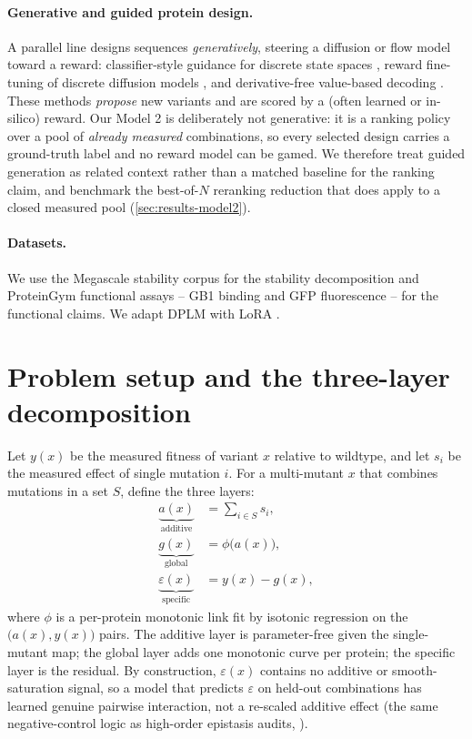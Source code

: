 \documentclass{article}
\newcommand{\eps}{\varepsilon}
\begin{document}
\paragraph{Generative and guided protein design.}
A parallel line designs sequences \emph{generatively}, steering a diffusion or
flow model toward a reward: classifier-style guidance for discrete state spaces
\citep{gruver2023protein,nisonoff2025unlocking}, reward fine-tuning of discrete
diffusion models \citep{wang2025drakes}, and derivative-free value-based decoding
\citep{li2024svdd}. These methods \emph{propose} new variants and are scored by a
(often learned or in-silico) reward. Our Model 2 is deliberately not generative:
it is a ranking policy over a pool of \emph{already measured} combinations, so
every selected design carries a ground-truth label and no reward model can be
gamed. We therefore treat guided generation as related context rather than a
matched baseline for the ranking claim, and benchmark the best-of-$N$ reranking
reduction that does apply to a closed measured pool (\cref{sec:results-model2}).

\paragraph{Datasets.}
We use the Megascale stability corpus \citep{tsuboyama2023mega} for the
stability decomposition and ProteinGym \citep{notin2023proteingym} functional
assays -- GB1 binding \citep{olson2014comprehensive,wu2016adaptation} and GFP
fluorescence \citep{sarkisyan2016local} -- for the functional claims. We adapt
DPLM \citep{wang2024dplm} with LoRA \citep{hu2022lora}.

\section{Problem setup and the three-layer decomposition}
\label{sec:decomp}

Let $y(x)$ be the measured fitness of variant $x$ relative to wildtype, and let
$s_i$ be the measured effect of single mutation $i$. For a multi-mutant $x$ that
combines mutations in a set $S$, define the three layers:
\begin{align}
  \underbrace{a(x)}_{\text{additive}} &= \sum_{i \in S} s_i, \\
  \underbrace{g(x)}_{\text{global}}   &= \phi\!\big(a(x)\big), \\
  \underbrace{\eps(x)}_{\text{specific}} &= y(x) - g(x),
\end{align}
where $\phi$ is a per-protein monotonic link fit by isotonic regression on the
$\big(a(x), y(x)\big)$ pairs. The additive layer is parameter-free given the
single-mutant map; the global layer adds one monotonic curve per protein; the
specific layer is the residual. By construction, $\eps(x)$ contains no additive
or smooth-saturation signal, so a model that predicts $\eps$ on held-out
combinations has learned genuine pairwise interaction, not a re-scaled additive
effect (the same negative-control logic as high-order epistasis audits,
\citealp{sailer2017detecting}).
\end{document}

